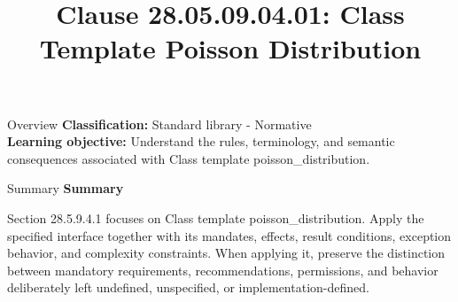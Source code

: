 \documentclass[10pt,letterpaper]{article}
\title{Clause 28.05.09.04.01: Class Template Poisson Distribution}
\author{}
\date{}
\begin{document}
\maketitle
\begin{CornellOverviewBox}{Overview}
\textbf{Classification:} Standard library - Normative\\[2pt]
\textbf{Learning objective:} Understand the rules, terminology, and semantic consequences associated with Class template poisson\_distribution.
\end{CornellOverviewBox}\begin{CornellSummaryBox}{Summary}
{\sffamily\bfseries\color{Accent} Summary}\par\vspace{3pt}Section 28.5.9.4.1 focuses on Class template poisson\_distribution. Apply the specified interface together with its mandates, effects, result conditions, exception behavior, and complexity constraints. When applying it, preserve the distinction between mandatory requirements, recommendations, permissions, and behavior deliberately left undefined, unspecified, or implementation-defined.
\end{CornellSummaryBox}
\end{document}

